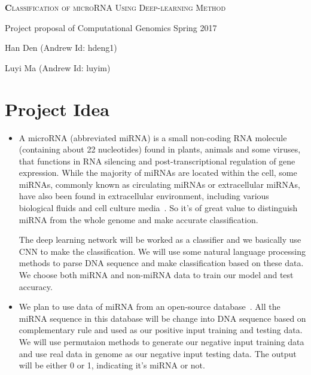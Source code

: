 \documentclass[letterpaper, 11pt]{article}
\begin{document}
\begin{center}
{\Large
	\textsc{\textbf Classification of microRNA Using Deep-learning Method}
}

\vspace{0.3cm}

\normalsize Project proposal of Computational Genomics Spring 2017

\vspace{0.5cm}

{\small
	Han Den (Andrew Id: hdeng1)
	
	Luyi Ma (Andrew Id: luyim)
}
\end{center}

\section{Project Idea}

\begin{itemize}
\item
A microRNA (abbreviated miRNA) is a small non-coding RNA molecule (containing about 22 nucleotides) found in plants, animals and some viruses, that functions in RNA silencing and post-transcriptional regulation of gene expression. While the majority of miRNAs are located within the cell, some miRNAs, commonly known as circulating miRNAs or extracellular miRNAs, have also been found in extracellular environment, including various biological fluids and cell culture media~\cite{Wiki}.
So it's of great value to distinguish miRNA from the whole genome and make accurate classification.


The deep learning network will be worked as a classifier and we basically use CNN to make the classification. We will use some natural language processing methods to parse DNA sequence and make classification based on these data. We choose both miRNA and non-miRNA data to train our model and test accuracy. 

\item 
We plan to use data of miRNA from an open-source database~\cite{miData}.
All the miRNA sequence in this database will be change into DNA sequence based on complementary rule and used as our positive input training and testing data. We will use permutaion methods to generate our negative input training data and use real data in genome as our negative input testing data. The output will be either 0 or 1, indicating it's miRNA or not.
\end{itemize}
\end{document}
